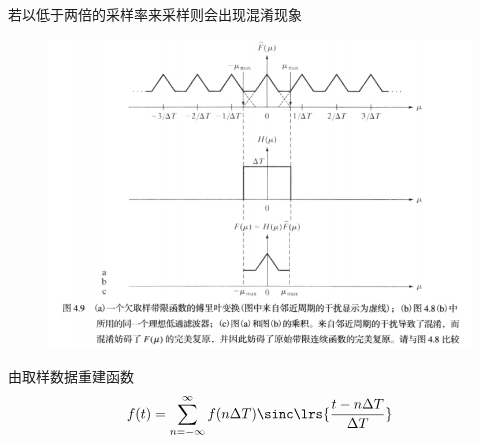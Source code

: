 若以低于两倍的采样率来采样则会出现混淆现象
\begin{figure}[H]
\centering
\includegraphics[width=0.8\linewidth]{fig/nyquist.png}
\end{figure}

由取样数据重建函数
\[f(t)=\sum_{n=-\infty}^{\infty}f(n\Delta T)\sinc\lrs{\frac{t-n\Delta T}{\Delta T}}\]

